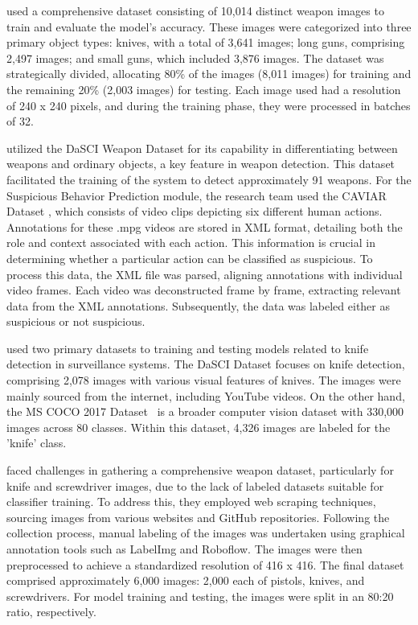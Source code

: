 \citet{rfc6} used a comprehensive dataset consisting of 10,014 distinct weapon images to train and evaluate the model's accuracy. These images were categorized into three primary object types: knives, with a total of 3,641 images; long guns, comprising 2,497 images; and small guns, which included 3,876 images. The dataset was strategically divided, allocating 80\% of the images (8,011 images) for training and the remaining 20\% (2,003 images) for testing. Each image used had a resolution of 240 x 240 pixels, and during the training phase, they were processed in batches of 32.

\citet{rfc7} utilized the DaSCI Weapon Dataset \cite{rfc29} for its capability in differentiating between weapons and ordinary objects, a key feature in weapon detection. This dataset facilitated the training of the system to detect approximately 91 weapons. For the Suspicious Behavior Prediction module, the research team used the CAVIAR Dataset \cite{rfc30}, which consists of video clips depicting six different human actions. Annotations for these .mpg videos are stored in XML format, detailing both the role and context associated with each action. This information is crucial in determining whether a particular action can be classified as suspicious. To process this data, the XML file was parsed, aligning annotations with individual video frames. Each video was deconstructed frame by frame, extracting relevant data from the XML annotations. Subsequently, the data was labeled either as suspicious or not suspicious. 

\citet{rfc18} used two primary datasets to training and testing models related to knife detection in surveillance systems. The DaSCI Dataset \cite{rfc29} focuses on knife detection, comprising 2,078 images with various visual features of knives. The images were mainly sourced from the internet, including YouTube videos. On the other hand, the MS COCO 2017 Dataset~\cite{rfc16} is a broader computer vision dataset with 330,000 images across 80 classes. Within this dataset, 4,326 images are labeled for the 'knife' class.

\citet{rfc17} faced challenges in gathering a comprehensive weapon dataset, particularly for knife and screwdriver images, due to the lack of labeled datasets suitable for classifier training. To address this, they employed web scraping techniques, sourcing images from various websites and GitHub repositories. Following the collection process, manual labeling of the images was undertaken using graphical annotation tools such as LabelImg and Roboflow. The images were then preprocessed to achieve a standardized resolution of 416 x 416. The final dataset comprised approximately 6,000 images: 2,000 each of pistols, knives, and screwdrivers. For model training and testing, the images were split in an 80:20 ratio, respectively.

